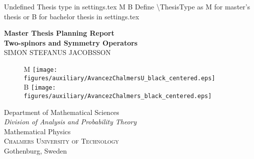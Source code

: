
\def\title{Two-spinors and Symmetry Operators}
\def\subtitle{An Investigation into the Existence of Symmetry Operators for the Massive Dirac Equation using Spinor Techniques and Computer Algebra Tools}
\def\myname{Simon Stefanus Jacobsson}
\def\supervisorname{Thomas Bäckdahl}
\def\examinername{Simone Calogero}
\def\programme{Physics}
\def\department{Mathematical Sciences}
\def\division{Analysis and Probability Theory}
\def\researchgroup{Mathematical Physics}


\ifx\ThesisType\undefined
Undefined Thesis type in settings.tex
\else
  \if\ThesisType M
    \else
    \if\ThesisType B
    \else
    Define \textbackslash ThesisType as M for master's thesis or B for bachelor thesis in settings.tex
    \fi
  \fi
\fi


\newpage
\thispagestyle{empty}
\begin{center}
	\textbf{\Large Master Thesis Planning Report\\\title} \\[1cm]
	{\large \MakeUppercase{\myname}}
	
	\vfill	
	\begin{figure}[H]
	\centering
	\if\ThesisType M
    \texttt{[image: figures/auxiliary/AvancezChalmersU\_black\_centered.eps]} \\
    \fi
    \if\ThesisType B
    \texttt{[image: figures/auxiliary/AvancezChalmers\_black\_centered.eps]} \\
    \fi
	\end{figure}	\vspace{5mm}	
	
	Department of \department \\
	\emph{Division of \division }\\
	\researchgroup\\
	\textsc{Chalmers University of Technology} \\
	Gothenburg, Sweden \the\year \\
\end{center}
